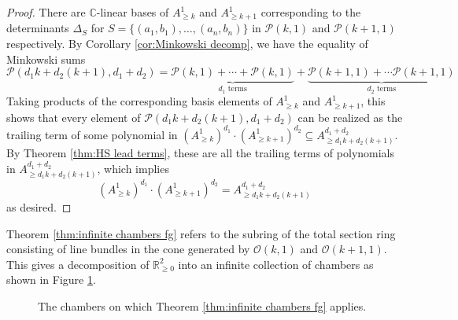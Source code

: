 \documentclass[12pt]{amsart}
\newcommand{\C}{\mathbb{C}}
\newcommand{\R}{\mathbb{R}}
\newcommand{\CO}{\mathcal{O}}
\numberwithin{equation}{section}
\theoremstyle{definition}
\begin{document}
\begin{proof}
    There are $\C$-linear bases of $A^1_{\geq k}$ and $A^1_{\geq k+1}$ corresponding to the determinants $\Delta_S$ for $S=\{(a_1,b_1),\dots,(a_n,b_n)\}$ in $\mathcal{P}(k,1)$ and $\mathcal{P}(k+1,1)$ respectively. By Corollary \ref{cor:Minkowski decomp}, we have the equality of Minkowski sums
    \[ \mathcal{P}(d_1 k+d_2(k+1),d_1+d_2) = \underbrace{\mathcal{P}(k,1)+\cdots+\mathcal{P}(k,1)}_{d_1 \text{ terms}}+\underbrace{\mathcal{P}(k+1,1)+\cdots \mathcal{P}(k+1,1)}_{d_2 \text{ terms}} \]
    Taking products of the corresponding basis elements of $A^1_{\geq k}$ and $A^1_{\geq k+1}$, this shows that every element of $\mathcal{P}(d_1 k+d_2(k+1),d_1+d_2)$ can be realized as the trailing term of some polynomial in $\left( A^1_{\geq k}\right)^{d_1} \cdot \left( A^1_{\geq k+1}\right)^{d_2} \subseteq A^{d_1+d_2}_{\geq d_1 k+d_2(k+1)}$. By Theorem \ref{thm:HS lead terms}, these are all the trailing terms of polynomials in $A^{d_1+d_2}_{\geq d_1 k+d_2(k+1)}$, which implies 
    \[ \left( A^1_{\geq k}\right)^{d_1} \cdot \left( A^1_{\geq k+1}\right)^{d_2} = A^{d_1+d_2}_{\geq d_1 k+d_2(k+1)} \]
    as desired.
\end{proof}

Theorem \ref{thm:infinite chambers fg} refers to the subring of the total section ring consisting of line bundles in the cone generated by $\CO(k,1)$ and $\CO(k+1,1)$. This gives a decomposition of $\R^2_{\geq 0}$ into an infinite collection of chambers as shown in Figure \ref{fig:infinite chambers fg}.

\begin{figure}[h]
    \centering
    \caption{The chambers on which Theorem \ref{thm:infinite chambers fg} applies.}
    \label{fig:infinite chambers fg}
\end{figure}
\end{document}
